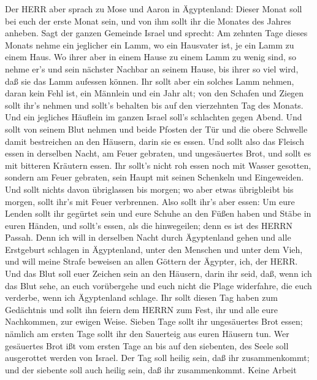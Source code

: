  Der HERR aber sprach zu Mose und Aaron in Ägyptenland:
 Dieser Monat soll bei euch der erste Monat sein, und von
ihm sollt ihr die Monates des Jahres anheben.  Sagt der
ganzen Gemeinde Israel und sprecht: Am zehnten Tage dieses Monats nehme
ein jeglicher ein Lamm, wo ein Hausvater ist, je ein Lamm zu einem Haus.
 Wo ihrer aber in einem Hause zu einem Lamm zu wenig sind,
so nehme er's und sein nächster Nachbar an seinem Hause, bis ihrer so
viel wird, daß sie das Lamm aufessen können.  Ihr sollt aber
ein solches Lamm nehmen, daran kein Fehl ist, ein Männlein und ein Jahr
alt; von den Schafen und Ziegen sollt ihr's nehmen  und
sollt's behalten bis auf den vierzehnten Tag des Monats. Und ein
jegliches Häuflein im ganzen Israel soll's schlachten gegen Abend.
 Und sollt von seinem Blut nehmen und beide Pfosten der Tür
und die obere Schwelle damit bestreichen an den Häusern, darin sie es
essen.  Und sollt also das Fleisch essen in derselben Nacht,
am Feuer gebraten, und ungesäuertes Brot, und sollt es mit bitteren
Kräutern essen.  Ihr sollt's nicht roh essen noch mit Wasser
gesotten, sondern am Feuer gebraten, sein Haupt mit seinen Schenkeln und
Eingeweiden.  Und sollt nichts davon übriglassen bis
morgen; wo aber etwas übrigbleibt bis morgen, sollt ihr's mit Feuer
verbrennen.  Also sollt ihr's aber essen: Um eure Lenden
sollt ihr gegürtet sein und eure Schuhe an den Füßen haben und Stäbe in
euren Händen, und sollt's essen, als die hinwegeilen; denn es ist des
HERRN Passah.  Denn ich will in derselben Nacht durch
Ägyptenland gehen und alle Erstgeburt schlagen in Ägyptenland, unter den
Menschen und unter dem Vieh, und will meine Strafe beweisen an allen
Göttern der Ägypter, ich, der HERR.  Und das Blut soll euer
Zeichen sein an den Häusern, darin ihr seid, daß, wenn ich das Blut
sehe, an euch vorübergehe und euch nicht die Plage widerfahre, die euch
verderbe, wenn ich Ägyptenland schlage.  Ihr sollt diesen
Tag haben zum Gedächtnis und sollt ihn feiern dem HERRN zum Fest, ihr
und alle eure Nachkommen, zur ewigen Weise.  Sieben Tage
sollt ihr ungesäuertes Brot essen; nämlich am ersten Tage sollt ihr den
Sauerteig aus euren Häusern tun. Wer gesäuertes Brot ißt vom ersten Tage
an bis auf den siebenten, des Seele soll ausgerottet werden von Israel.
 Der Tag soll heilig sein, daß ihr zusammenkommt; und der
siebente soll auch heilig sein, daß ihr zusammenkommt. Keine Arbeit
